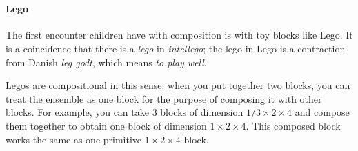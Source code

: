 

\section{}

\paragraph{Lego}

The first encounter children have with composition is with toy blocks like Lego. It is a coincidence that there is a \emph{lego} in \emph{intellego}; the lego in Lego is a contraction from Danish \emph{leg godt}, which means \emph{to play well}.

Legos are compositional in this sense: when you put together two blocks, you can treat the ensemble as one block for the purpose of composing it with other blocks. For example, you can take 3 blocks of dimension $1/3 \times 2 \times 4$ and compose them together to obtain one block of dimension $1 \times 2 \times 4$. This composed block works the same as one primitive  $1 \times 2 \times 4 $ block.

\hfill
{}
\hfill
{}
\hfill

 
